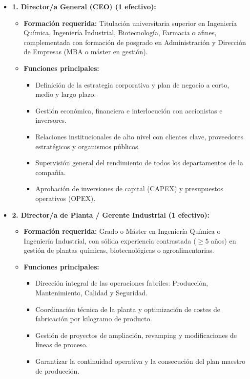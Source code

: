 \begin{itemize}[leftmargin=*]
    \item \textbf{1. Director/a General (CEO) (1 efectivo):}
          \begin{itemize}
              \item \textbf{Formación requerida:} Titulación universitaria superior en Ingeniería Química, Ingeniería Industrial, Biotecnología, Farmacia o afines, complementada con formación de posgrado en Administración y Dirección de Empresas (MBA o máster en gestión).
              \item \textbf{Funciones principales:}
                    \begin{itemize}
                        \item Definición de la estrategia corporativa y plan de negocio a corto, medio y largo plazo.
                        \item Gestión económica, financiera e interlocución con accionistas e inversores.
                        \item Relaciones institucionales de alto nivel con clientes clave, proveedores estratégicos y organismos públicos.
                        \item Supervisión general del rendimiento de todos los departamentos de la compañía.
                        \item Aprobación de inversiones de capital (CAPEX) y presupuestos operativos (OPEX).
                    \end{itemize}
          \end{itemize}

    \item \textbf{2. Director/a de Planta / Gerente Industrial (1 efectivo):}
          \begin{itemize}
              \item \textbf{Formación requerida:} Grado o Máster en Ingeniería Química o Ingeniería Industrial, con sólida experiencia contrastada ($\geq 5$ años) en gestión de plantas químicas, biotecnológicas o agroalimentarias.
              \item \textbf{Funciones principales:}
                    \begin{itemize}
                        \item Dirección integral de las operaciones fabriles: Producción, Mantenimiento, Calidad y Seguridad.
                        \item Coordinación técnica de la planta y optimización de costes de fabricación por kilogramo de producto.
                        \item Gestión de proyectos de ampliación, revamping y modificaciones de líneas de proceso.
                        \item Garantizar la continuidad operativa y la consecución del plan maestro de producción.
                    \end{itemize}
          \end{itemize}
\end{itemize}

